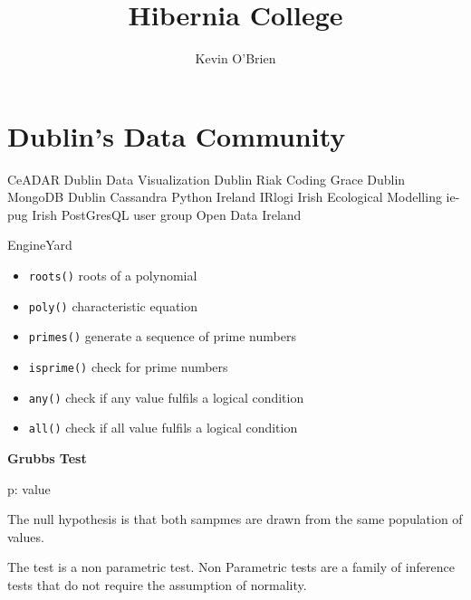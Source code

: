 \documentclass[12pt]{article} %
\title{Hibernia College}
\author{Kevin O'Brien}
\begin{document}
\maketitle
\tableofcontents







\section{Dublin's Data Community}

CeADAR
Dublin Data Visualization
Dublin Riak
Coding Grace
Dublin MongoDB
Dublin Cassandra
Python Ireland
IRlogi
Irish Ecological Modelling
ie-pug Irish PostGresQL user group
Open Data Ireland

EngineYard

\begin{itemize}
\item \texttt{roots()} roots of a polynomial
\item \texttt{poly()} characteristic equation
\item \texttt{primes()} generate a sequence of prime numbers
\item \texttt{isprime()} check for prime numbers
\item \texttt{any()} check if any value fulfils a logical condition
\item \texttt{all()} check if all value fulfils a logical condition
\end{itemize}

 \newpage

\textbf{Grubbs Test}

p: value



The null hypothesis is that both sampmes are drawn from the same population of values.

The test is a non parametric test. Non Parametric tests are a family of inference tests that do not require the assumption of normality.
\end{document}
